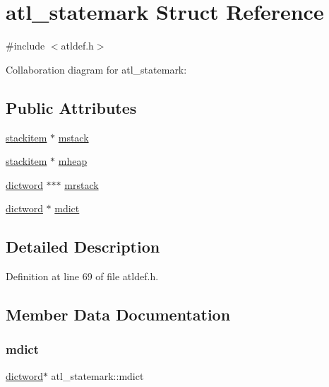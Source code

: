\hypertarget{structatl__statemark}{}\section{atl\+\_\+statemark Struct Reference}
\label{structatl__statemark}


{\ttfamily \#include $<$atldef.\+h$>$}



Collaboration diagram for atl\+\_\+statemark\+:
\subsection*{Public Attributes}
\begin{DoxyCompactItemize}
\item 
\hyperlink{atldef_8h_aa59671df873ab6e8eef907b8b270c289}{stackitem} $\ast$ \hyperlink{structatl__statemark_a7030bfc0e475cd34bd0c33a4808b8ab0}{mstack}
\item 
\hyperlink{atldef_8h_aa59671df873ab6e8eef907b8b270c289}{stackitem} $\ast$ \hyperlink{structatl__statemark_aba09067ebbeb5f98c1516fad2f164051}{mheap}
\item 
\hyperlink{atldef_8h_ae7377e5eb7d9a7da50cd10838d479299}{dictword} $\ast$$\ast$$\ast$ \hyperlink{structatl__statemark_a5ac932fb973413078567978b4d86dc86}{mrstack}
\item 
\hyperlink{atldef_8h_ae7377e5eb7d9a7da50cd10838d479299}{dictword} $\ast$ \hyperlink{structatl__statemark_a6c2db669072b505705e1c4e19b819364}{mdict}
\end{DoxyCompactItemize}


\subsection{Detailed Description}


Definition at line 69 of file atldef.\+h.



\subsection{Member Data Documentation}
\mbox{\label{structatl__statemark_a6c2db669072b505705e1c4e19b819364}} 
\subsubsection{\texorpdfstring{mdict}{mdict}}
{\footnotesize\ttfamily \hyperlink{atldef_8h_ae7377e5eb7d9a7da50cd10838d479299}{dictword}$\ast$ atl\+\_\+statemark\+::mdict}



